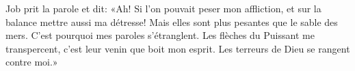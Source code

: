 Job prit la parole et dit:
	«Ah! Si l’on pouvait peser mon affliction, et sur la balance mettre aussi ma détresse!
	Mais elles sont plus pesantes que le sable des mers.
	C’est pourquoi mes paroles s’étranglent.
Les flèches du Puissant me transpercent, c’est leur venin que boit mon esprit.
	Les terreurs de Dieu se rangent contre moi.»
